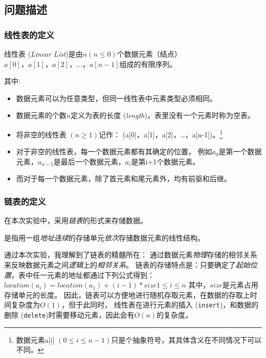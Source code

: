 \subsection{问题描述}
\subsubsection{线性表的定义}
\begin{definition}\label{def:linear list}
    线性表 (\emph{Linear List})是由$n (n \le 0)$个数据元素（结点）$a[0]，a[1]，a[2]，\dots ，a[n-1]$组成的有限序列。
\end{definition}
其中:
\begin{itemize}
    \item 数据元素可以为任意类型，但同一线性表中元素类型必须相同。
    \item 数据元素的个数$n$定义为表的长度 (\emph{length})，表里没有一个元素时称为空表。
    \item 将非空的线性表 $(n \ge 1)$记作： (a[0]，a[1]，a[2]，\dots ，a[n-1])。\footnote{数据元素a[i] $(0\le i \le n-1)$只是个抽象符号，其具体含义在不同情况下可以不同。}
    \item 对于非空的线性表，每一个数据元素都有其确定的位置，
        例如$a_{0}$是第一个数据元素，$a_{n-1}$是最后一个数据元素，$a_i$是第i+1个数据元素。
    \item 而对于每一个数据元素，除了首元素和尾元素外，均有前驱和后继。
\end{itemize}
\subsubsection{链表的定义}
在本次实验中，采用\emph{链表}的形式来存储数据。
\begin{definition}\label{def:list}
    是指用一组\emph{地址连续}的存储单元\emph{依次}存储数据元素的线性结构。
\end{definition}
通过本次实验，我理解到了链表的精髓所在：
通过数据元素\emph{物理}存储的相邻关系来反映数据元素之间\emph{逻辑}上的\emph{相邻关系}。
\newline
链表的存储特点是：只要确定了\emph{起始位置}，表中任一元素的地址都通过下列公式得到：
$location(a_i) = location(a_1) + (i-1) * size 　1\le i\le n$ 其中，$size$是元素占用存储单元的长度。
因此，链表可以方便地进行随机存取元素，在数据的存取上时间复杂度为$O(1)$，但于此同时，
线性表在进行元素的插入 (\texttt{insert})，和数据的删除 (\texttt{delete})时需要移动元素，因此会有$O(n)$的复杂度。

